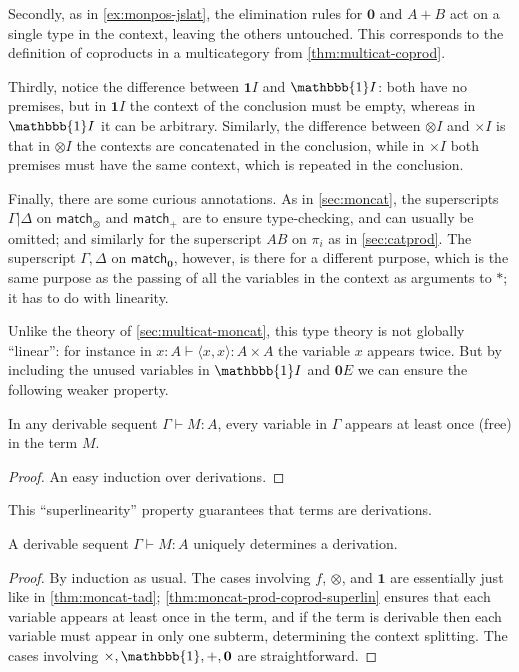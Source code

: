 \documentclass{book}
\let\types\vdash
\def\unit{\mathbbb{1}}%
\def\ttt{\mathord{\ast}}%
\def\timesI{\ensuremath{\mathord{\times}I}}
\def\pair#1#2{\langle #1,#2\rangle}
\def\match{\mathsf{match}}
\def\zero{\mathbf{0}}
\def\abort{\match_{\zero}}
\def\one{\mathbf{1}}
\let\tensor\otimes
\def\tensorI{\mathord{\tensor}I}
\begin{document}
Secondly, as in \cref{ex:monpos-jslat}, the elimination rules for $\zero$ and $A+B$ act on a single type in the context, leaving the others untouched.
This corresponds to the definition of coproducts in a multicategory from \cref{thm:multicat-coprod}.

Thirdly, notice the difference between $\one I$ and $\unit I$: both have no premises, but in $\one I$ the context of the conclusion must be empty, whereas in $\unit I$ it can be arbitrary.
Similarly, the difference between $\tensorI$ and $\timesI$ is that in $\tensorI$ the contexts are concatenated in the conclusion, while in $\timesI$ both premises must have the same context, which is repeated in the conclusion.

Finally, there are some curious annotations.
As in \cref{sec:moncat}, the superscripts $\Gamma|\Delta$ on $\match_\tensor$ and $\match_+$ are to ensure type-checking, and can usually be omitted; and similarly for the superscript $AB$ on $\pi_i$ as in \cref{sec:catprod}.
The superscript $\Gamma,\Delta$ on $\abort$, however, is there for a different purpose, which is the same purpose as the passing of all the variables in the context as arguments to $\ttt$; it has to do with linearity.

Unlike the theory of \cref{sec:multicat-moncat}, this type theory is not globally ``linear'': for instance in $x:A \types \pair x x : A\times A$ the variable $x$ appears twice.
But by including the unused variables in $\unit I$ and $\zero E$ we can ensure the following weaker property.

\begin{lem}\label{thm:moncat-prod-coprod-superlin}
  In any derivable sequent $\Gamma\types M:A$, every variable in $\Gamma$ appears at least once (free) in the term $M$.
\end{lem}
\begin{proof}
  An easy induction over derivations.
\end{proof}

This ``superlinearity'' property guarantees that terms are derivations.

\begin{lem}\label{thm:moncat-prod-coprod-tad}
  A derivable sequent $\Gamma\types M:A$ uniquely determines a derivation.
\end{lem}
\begin{proof}
  By induction as usual.
  The cases involving $f$, $\tensor$, and $\one$ are essentially just like in \cref{thm:moncat-tad}; \cref{thm:moncat-prod-coprod-superlin} ensures that each variable appears at least once in the term, and if the term is derivable then each variable must appear in only one subterm, determining the context splitting.
  The cases involving $\times,\unit,+,\zero$ are straightforward.
\end{proof}
\end{document}
